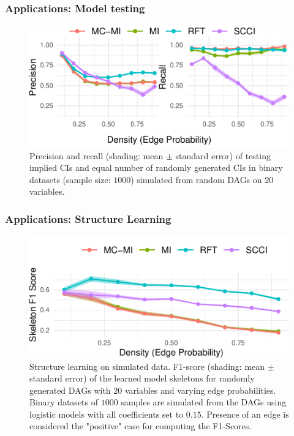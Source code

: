 \documentclass{beamer}
\begin{document}
\begin{frame}
	\frametitle{Applications: Model testing}
	\begin{figure}
		\centering
		\includegraphics{imgs/model_testing.pdf}
		\caption{Precision and recall (shading: mean $\pm$ standard
		error) of testing implied CIs and equal number of randomly
		generated CIs in binary datasets (sample size: $1000$)
		simulated from random DAGs on $ 20 $ variables.}
	\end{figure}
\end{frame}

\begin{frame}
	\frametitle{Applications: Structure Learning}
	\begin{figure}
		\centering
		\includegraphics{imgs/sl_density.pdf}
		\caption{Structure learning on simulated data. F1-score
		(shading: mean $\pm$ standard error) of the learned model
		skeletons for randomly generated DAGs with $20$ variables and
		varying edge probabilities.  Binary datasets of $ 1000 $
		samples are simulated from the DAGs using logistic models with
		all coefficients set to $ 0.15$. Presence of an edge is
		considered the "positive" case for computing the F1-Scores.}
	\end{figure}
\end{frame}
\end{document}
